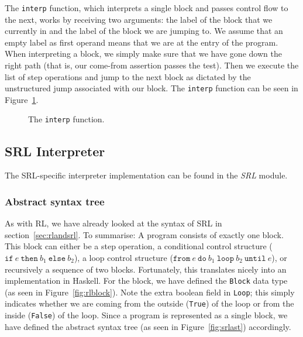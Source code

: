 \noindent The \texttt{interp} function, which interprets a single block and passes control flow to the next, works by receiving two arguments: the label of the block that we currently in and the label of the block we are jumping to. We assume that an empty label as first operand means that we are at the entry of the program. When interpreting a block, we simply make sure that we have gone down the right path (that is, our come-from assertion passes the test). Then we execute the list of step operations and jump to the next block as dictated by the unstructured jump associated with our block. The \texttt{interp} function can be seen in Figure~\ref{fig:interp}.

\begin{figure}[H]
  
  \caption{The \texttt{interp} function.}\label{fig:interp}
\end{figure}

\subsection{SRL Interpreter}

The SRL-specific interpreter implementation can be found in the \textit{SRL} module.

\subsubsection{Abstract syntax tree}

As with RL, we have already looked at the syntax of SRL in section~\ref{sec:rlandsrl}. To summarise: A program consists of exactly one block. This block can either be a step operation, a conditional control structure ($\texttt{if} \ e \ \texttt{then} \ b_1 \ \texttt{else} \ b_2$), a loop control structure ($\texttt{from} \ e \ \texttt{do} \ b_1 \ \texttt{loop} \ b_2 \ \texttt{until} \ e$), or recursively a sequence of two blocks. Fortunately, this translates nicely into an implementation in Haskell. For the block, we have defined the \texttt{Block} data type (as seen in Figure~\ref{fig:rlblock}). Note the extra boolean field in \texttt{Loop}; this simply indicates whether we are coming from the outside (\texttt{True}) of the loop or from the inside (\texttt{False}) of the loop. Since a program is represented as a single block, we have defined the abstract syntax tree (as seen in Figure~\ref{fig:srlast}) accordingly.

